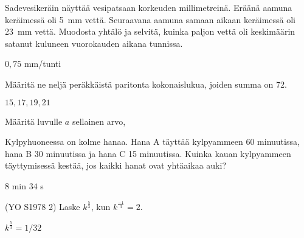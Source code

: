 \begin{tehtavasivu}
\begin{tehtava}
Sadevesikeräin näyttää vesipatsaan korkeuden millimetreinä. Eräänä aamuna
keräimessä oli 5~mm vettä. Seuraavana aamuna samaan aikaan keräimessä oli 23~mm vettä. Muodosta yhtälö ja selvitä, kuinka paljon vettä oli keskimäärin satanut kuluneen vuorokauden aikana tunnissa.
	\begin{vastaus}
	$0,75$ mm/tunti
	\end{vastaus}
\end{tehtava}

\begin{tehtava}
Määritä ne neljä peräkkäistä paritonta kokonaislukua, joiden summa on 72.
	\begin{vastaus}
	 $15, 17, 19, 21$
	\end{vastaus}
\end{tehtava}


\begin{tehtava}
Määritä luvulle $a$ sellainen arvo, 
  \begin{alakohdat}
  \end{alakohdat}
\begin{vastaus}
   \begin{alakohdat}
      \end{alakohdat}
\end{vastaus}
\end{tehtava}

\begin{tehtava}
Kylpyhuoneessa on kolme hanaa. Hana A täyttää kylpyammeen 60 minuutissa, hana B 30 minuutissa ja hana C 15 minuutissa. Kuinka kauan kylpyammeen täyttymisessä kestää, jos kaikki hanat ovat yhtäaikaa auki?
\begin{vastaus}
$8$ min $34$ s
\end{vastaus}
\end{tehtava}

\begin{tehtava} 
(YO S1978 2) Laske $k^\frac{5}{3}$, kun $k^\frac{-1}{3}=2$. \\
	\begin{vastaus}
		$k^\frac{5}{3}=1/32$
	\end{vastaus}
\end{tehtava}


\end{tehtavasivu}
